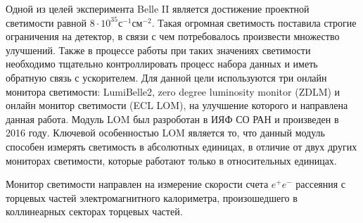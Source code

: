   Одной из целей эксперимента Belle II является достижение проектной светимости равной $8\cdot10^{35}$с$^{-1}$см$^{-2}$. Такая огромная светимость поставила строгие ограничения на детектор, в связи с чем потребовалось произвести множество улучшений. Также в процессе работы при таких значениях светимости необходимо тщательно контроллировать процесс набора данных и иметь обратную связь с ускорителем. Для данной цели используются три онлайн монитора светимости: LumiBelle2, zero degree luminosity monitor (ZDLM) и онлайн монитор светимости (ECL LOM), на улучшение которого и направлена данная работа. Модуль LOM был разроботан в ИЯФ СО РАН и произведен в 2016 году. Ключевой особенностью LOM является то, что данный модуль способен измерять светимость в абсолютных единицах, в отличие от двух других мониторах светимости, которые работают только в относительных единицах.\par 
  Монитор светимости направлен на измерение скорости счета $e^+e^-$ рассеяния с торцевых частей электромагнитного калориметра, произошедшего в коллинеарных секторах торцевых частей. 

